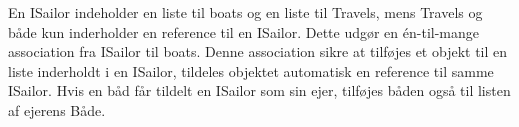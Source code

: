 En ISailor indeholder en liste til boats og en liste til Travels, mens Travels og både kun inderholder en reference til en ISailor. Dette udgør en én-til-mange association fra ISailor til boats. Denne association sikre at tilføjes et objekt til en liste inderholdt i en ISailor, tildeles objektet automatisk en reference til samme ISailor. Hvis en båd får tildelt en ISailor som sin ejer, tilføjes båden også til listen af ejerens Både. 


